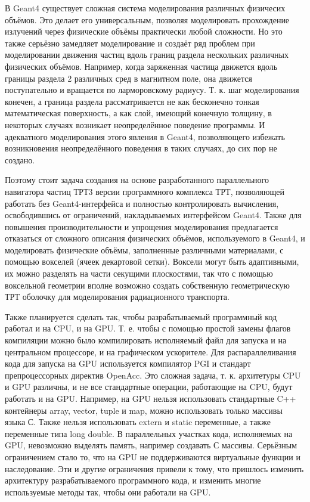 \documentclass[a4paper,12pt]{article}
\begin{document}
\begin{large}
    В Geant4 существует сложная система моделирования различных физичесих объёмов. Это делает его универсальным, позволяя моделировать прохождение излучений через физические объёмы практически любой сложности. Но это также серьёзно замедляет моделирование и создаёт ряд проблем при моделировании движения частиц вдоль границ раздела нескольких различных физических объёмов. Например, когда заряженная частица движется вдоль границы раздела 2 различных сред в магнитном поле, она движется поступательно и вращается по ларморовскому радиусу. Т. к. шаг моделирования конечен, а граница раздела рассматривается не как бесконечно тонкая математическая поверхность, а как слой, имеющий конечную толщину, в некоторых случаях возникает неопределённое поведение программы. И адекватного моделирования этого явления в Geant4, позволяющего избежать возникновения неопределённого поведения в таких случаях, до сих пор не создано.
    
    Поэтому стоит задача создания на основе разработанного параллельного навигатора частиц ТРТ3 версии программного комплекса ТРТ, позволяющей работать без Geant4-интерфейса и полностью контролировать вычисления, освободившись от ограничений, накладываемых интерфейсом Geant4. Также для повышения производительности и упрощения моделирования предлагается отказаться от сложного описания физических объёмов, используемого в Geant4, и моделировать физические объёмы, заполненные различными материалами, с помощью вокселей (ячеек декартовой сетки). Воксели могут быть адаптивными, их можно разделять на части секущими плоскостями, так что с помощью воксельной геометрии вполне возможно создать собственную геометрическую ТРТ оболочку для моделирования радиационного транспорта.
    
    Также планируется сделать так, чтобы разрабатываемый программный код работал и на CPU, и на GPU. Т. е. чтобы с помощью простой замены флагов компиляции можно было компилировать исполняемый файл для запуска и на центральном процессоре, и на графическом ускорителе. Для распараллеливания кода для запуска на GPU используется компилятор PGI и стандарт препроцессорных директив OpenAcc. Это сложная задача, т. к. архитетуры CPU и GPU различны, и не все стандартные операции, работающие на CPU, будут работать и на GPU. Например, на GPU нельзя использовать стандартные C++ контейнеры array, vector, tuple и map, можно использовать только массивы языка С. Также нельзя использовать extern и static переменные, а также переменные типа long double. В параллельных участках кода, исполняемых на GPU, невозможно выделять память, например создавать С массивы. Серьёзным ограничением стало то, что на GPU не поддерживаются виртуальные функции и наследование. Эти и другие ограничения привели к тому, что пришлось изменить архитектуру разрабатываемого программного кода, и изменить многие используемые методы так, чтобы они работали на GPU.
    

\end{large}
\end{document}
